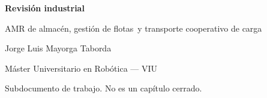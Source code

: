 \documentclass[12pt,a4paper]{article}
\begin{document}
\begin{center}
  {\LARGE\bfseries Revisión industrial\par}
  \vspace{2mm}
  {\large AMR de almacén, gestión de flotas\
   y transporte cooperativo de carga\par}
  \vspace{4mm}
  {\normalsize Jorge Luis Mayorga Taborda\par}
  {\footnotesize Máster Universitario en Robótica --- VIU\par}
  {\footnotesize Subdocumento de trabajo. No es un capítulo cerrado.\par}
\end{center}

\vspace{4mm}
\tableofcontents
\vspace{6mm}








\printbibliography[title={Referencias}]
\end{document}
